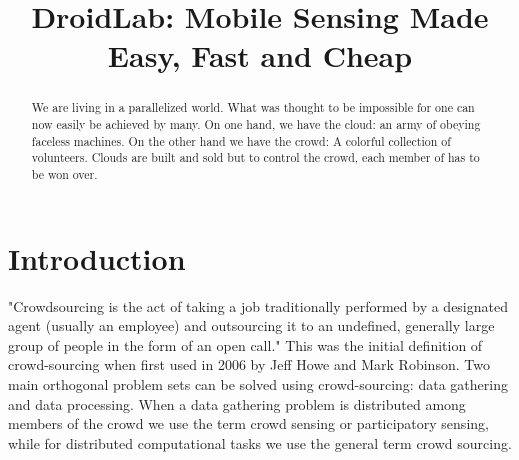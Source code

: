 \documentclass[conference,letterpaper]{IEEEtran}
\begin{document}

\title{DroidLab: Mobile Sensing Made Easy, Fast and Cheap}
\author{
  }




\maketitle


\begin{abstract}
We are living in a parallelized world. What was thought to be impossible for one can now easily be achieved by many. On one hand, we have the cloud: an army of obeying faceless machines. On the other hand we have the crowd: A colorful collection of volunteers. Clouds are built and sold but to control the crowd, each member of has to be won over.
\end{abstract}

\begin{IEEEkeywords}
\end{IEEEkeywords}
 
\section{Introduction}
\label{sec:intro}
\cite{Doe:2009:Online}
"Crowdsourcing is the act of taking a job traditionally performed by a designated agent (usually an employee) and outsourcing it to an undefined, generally large group of people in the form of an open call." This was the initial definition of crowd-sourcing when first used in 2006  by Jeff Howe and Mark Robinson. Two main orthogonal problem sets can be solved using crowd-sourcing: data gathering and data processing. When a data gathering problem is distributed among members of the crowd we use the term crowd sensing or participatory sensing, while for distributed computational tasks we use the general term crowd sourcing.
\end{document}
